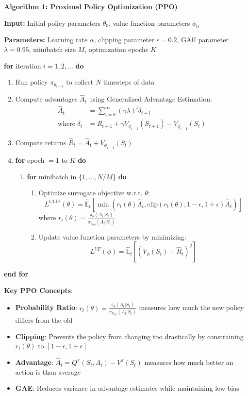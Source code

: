 \documentclass[11pt]{article}
\begin{document}
\begin{mathdetails}
\textbf{Algorithm 1: Proximal Policy Optimization (PPO)}

\textbf{Input:} Initial policy parameters $\theta_0$, value function parameters $\phi_0$

\textbf{Parameters:} Learning rate $\alpha$, clipping parameter $\epsilon = 0.2$, GAE parameter $\lambda = 0.95$, minibatch size $M$, optimization epochs $K$

\textbf{for} iteration $i = 1, 2, \ldots$ \textbf{do}
\begin{enumerate}
\item Run policy $\pi_{\theta_{i-1}}$ to collect $N$ timesteps of data
\item Compute advantages $\hat{A}_t$ using Generalized Advantage Estimation:
   \begin{align}
   \hat{A}_t &= \sum_{l=0}^{\infty} (\gamma \lambda)^l \delta_{t+l} \\
   \text{where } \delta_t &= R_{t+1} + \gamma V_{\phi_{i-1}}(S_{t+1}) - V_{\phi_{i-1}}(S_t)
   \end{align}
\item Compute returns $\hat{R}_t = \hat{A}_t + V_{\phi_{i-1}}(S_t)$
\item \textbf{for} epoch $= 1$ to $K$ \textbf{do}
   \begin{enumerate}
   \item \textbf{for} minibatch in $\{1, \ldots, N/M\}$ \textbf{do}
      \begin{enumerate}
      \item Optimize surrogate objective w.r.t. $\theta$:
         $$L^{\text{CLIP}}(\theta) = \hat{\mathbb{E}}_t\left[\min\left(r_t(\theta)\hat{A}_t, \text{clip}(r_t(\theta), 1-\epsilon, 1+\epsilon)\hat{A}_t\right)\right]$$
         where $r_t(\theta) = \frac{\pi_\theta(A_t|S_t)}{\pi_{\theta_{\text{old}}}(A_t|S_t)}$
      \item Update value function parameters by minimizing:
         $$L^{VF}(\phi) = \hat{\mathbb{E}}_t\left[\left(V_{\phi}(S_t) - \hat{R}_t\right)^2\right]$$
      \end{enumerate}
   \end{enumerate}
\end{enumerate}
\textbf{end for}
\end{mathdetails}

\begin{example}
\textbf{Key PPO Concepts}:
\begin{itemize}
\item \textbf{Probability Ratio}: $r_t(\theta) = \frac{\pi_\theta(A_t|S_t)}{\pi_{\theta_{\text{old}}}(A_t|S_t)}$ measures how much the new policy differs from the old
\item \textbf{Clipping}: Prevents the policy from changing too drastically by constraining $r_t(\theta)$ to $[1-\epsilon, 1+\epsilon]$
\item \textbf{Advantage}: $\hat{A}_t = Q^{\pi}(S_t, A_t) - V^{\pi}(S_t)$ measures how much better an action is than average
\item \textbf{GAE}: Reduces variance in advantage estimates while maintaining low bias
\end{itemize}
\end{example}
\end{document}
